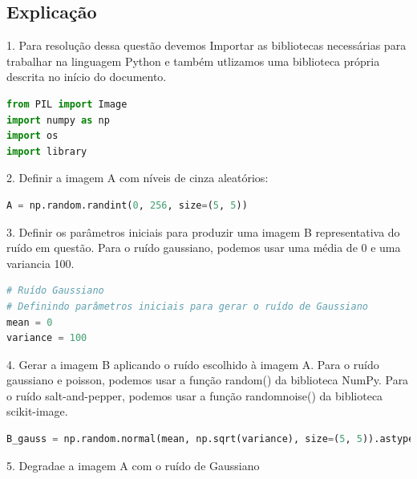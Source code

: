 \documentclass[10pt,a4paper]{article}
\begin{document}
\subsection{Explicação}

\begin{flushleft}
1. Para resolução dessa questão devemos  Importar as bibliotecas necessárias para trabalhar na linguagem Python e também utlizamos uma biblioteca própria descrita no início do documento.
\end{flushleft}

\begin{lstlisting}[language=Python]
from PIL import Image
import numpy as np
import os
import library
\end{lstlisting}

\begin{flushleft}
2. Definir a imagem A com níveis de cinza aleatórios:
\end{flushleft}

\begin{lstlisting}[language=Python]
A = np.random.randint(0, 256, size=(5, 5))
\end{lstlisting}

\begin{flushleft}
3. Definir os parâmetros iniciais para produzir uma imagem B representativa do ruído em questão. Para o ruído gaussiano, podemos usar uma média de 0 e uma variancia 100. 
\end{flushleft}

\begin{lstlisting}[language=Python]
# Ruído Gaussiano
# Definindo parâmetros iniciais para gerar o ruído de Gaussiano
mean = 0
variance = 100
\end{lstlisting}

\begin{flushleft}
4. Gerar a imagem B aplicando o ruído escolhido à imagem A. Para o ruído gaussiano e poisson, podemos usar a função random() da biblioteca NumPy. Para o ruído salt-and-pepper, podemos usar a função random\textunderscore noise() da biblioteca scikit-image.
\end{flushleft}

\begin{lstlisting}[language=Python]
B_gauss = np.random.normal(mean, np.sqrt(variance), size=(5, 5)).astype(int)

\end{lstlisting}

\begin{flushleft}
5. Degradae a imagem A com o ruído de Gaussiano
\end{flushleft}
\end{document}

